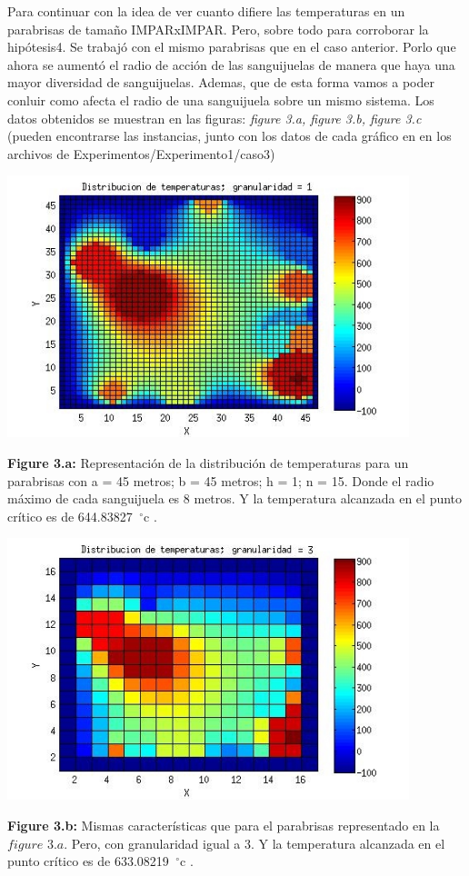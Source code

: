 Para continuar con la idea de ver cuanto difiere las temperaturas en un parabrisas de tamaño IMPARxIMPAR. Pero, sobre todo para corroborar la hipótesis4. Se trabajó con el mismo parabrisas que en el caso anterior. Porlo que ahora se aumentó el radio de acción de las sanguijuelas de manera que haya una mayor diversidad de sanguijuelas. Ademas, que de esta forma vamos a poder conluir como afecta el radio de una sanguijuela sobre un mismo sistema. Los datos obtenidos se muestran en las figuras: \textit{figure 3.a, figure 3.b, figure 3.c} (pueden encontrarse las instancias, junto con los datos de cada gráfico en en los archivos de Experimentos/Experimento1/caso3) \newline


\includegraphics[width=\textwidth,height=3.0in,keepaspectratio
]{r7h1.jpg} \newline
\begin {flushleft}
\textbf{Figure 3.a:} Representación de la distribución de temperaturas para un parabrisas con a = 45 metros; b = 45 metros; h = 1; n = 15. Donde el radio máximo de cada sanguijuela es 8 metros. Y la temperatura alcanzada en el punto crítico es de 644.83827\hspace{-1.5mm}$\phantom{a}^{\circ}$c .
\end{flushleft}

\includegraphics[width=\textwidth,height=3.0in,keepaspectratio
]{r7h3.jpg} \newline
\begin {flushleft}
\textbf{Figure 3.b:} Mismas características que para el parabrisas representado en la $figure$ $3.a$. Pero, con granularidad igual a 3. Y la temperatura alcanzada en el punto crítico es de 633.08219\hspace{-1.5mm}$\phantom{a}^{\circ}$c .
\end{flushleft}

